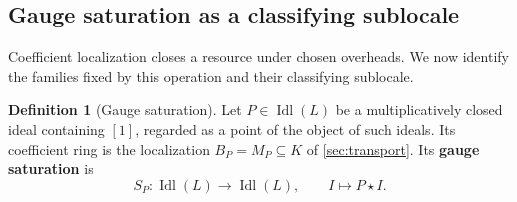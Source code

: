 \documentclass[11pt,a4paper]{article}
\numberwithin{algorithm}{section}
\numberwithin{equation}{section}
\theoremstyle{definition}
\newtheorem{definition}[definition]{Definition}
\theoremstyle{remark}
\theoremstyle{plain}
\newcommand{\Idl}{\operatorname{Idl}}
\theoremstyle{definition}
\theoremstyle{plain}
\begin{document}
\subsection{Gauge saturation as a classifying sublocale}
\label{sec:gauge-sublocale}
Coefficient localization closes a resource under chosen overheads.
We now identify the families fixed by this operation and their
classifying sublocale. 

\begin{definition}[Gauge saturation]\label{def:gauge-saturation}
Let $P\in\Idl(L)$ be a multiplicatively closed
ideal containing $[1]$, regarded as a point of the object of such
ideals. Its coefficient ring is the localization $B_P=M_P\subseteq K$
of \cref{sec:transport}. Its \textbf{gauge saturation} is
\[
 S_P:\Idl(L)\longrightarrow\Idl(L),\qquad I\longmapsto P\star I.
\]
\end{definition}
\end{document}
